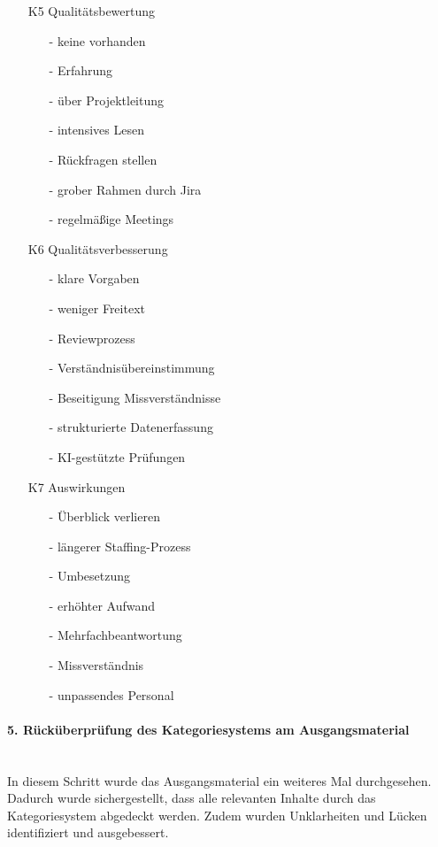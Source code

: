 \begin{itemize}
\begin{itemize}
	\end{itemize}
	\item[K5] Qualitätsbewertung
	\begin{itemize}
		\item[-] keine vorhanden
		\item[-] Erfahrung
		\item[-] über Projektleitung
		\item[-] intensives Lesen
		\item[-] Rückfragen stellen
		\item[-] grober Rahmen durch Jira
		\item[-] regelmäßige Meetings
	\end{itemize}
	\item[K6] Qualitätsverbesserung
	\begin{itemize}
		\item[-] klare Vorgaben
		\item[-] weniger Freitext
		\item[-] Reviewprozess
		\item[-] Verständnisübereinstimmung
		\item[-] Beseitigung Missverständnisse
		\item[-] strukturierte Datenerfassung
		\item[-] KI-gestützte Prüfungen
	\end{itemize}
	\item[K7] Auswirkungen
	\begin{itemize}
		\item[-] Überblick verlieren
		\item[-] längerer Staffing-Prozess
		\item[-] Umbesetzung
		\item[-] erhöhter Aufwand
		\item[-] Mehrfachbeantwortung
		\item[-] Missverständnis
		\item[-] unpassendes Personal
	\end{itemize}
\end{itemize}
\paragraph{5. Rücküberprüfung des Kategoriesystems am Ausgangsmaterial}\mbox{} \\
In diesem Schritt wurde das Ausgangsmaterial ein weiteres Mal durchgesehen. Dadurch wurde sichergestellt, dass alle relevanten Inhalte durch das Kategoriesystem abgedeckt werden. Zudem wurden Unklarheiten und Lücken identifiziert und ausgebessert.
